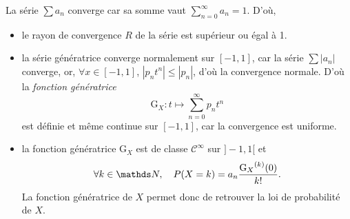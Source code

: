 La série $\sum a_n$\/ converge car sa somme vaut $\sum_{n=0}^\infty a_n = 1$. D'où, 
\begin{itemize}
  \item le rayon de convergence $R$\/ de la série est supérieur ou égal à 1.
  \item la série génératrice converge normalement sur $[-1,1]$, car la série $\sum |a_n|$\/ converge, or, $\forall x \in [-1,1]$, $|p_nt^n| \le |p_n|$, d'où la convergence normale.
    D'où la \textit{fonction génératrice} \[
      \mathrm{G}_X \colon t \longmapsto \sum_{n=0}^\infty p_n t^n
    \] est définie et même continue sur $[-1,1]$, car la convergence est uniforme.
  \item la fonction génératrice $\mathrm{G}_X$\/ est de classe $\mathcal{C}^\infty$\/ sur $]-1,1[$\/ et \[
      \forall k \in \N,\quad P(X = k) = a_n \frac{{\mathrm{G}_X}^{(k)}(0)}{k!}
    .\] La fonction génératrice de $X$\/ permet donc de retrouver la loi de probabilité de $X$.
\end{itemize}

